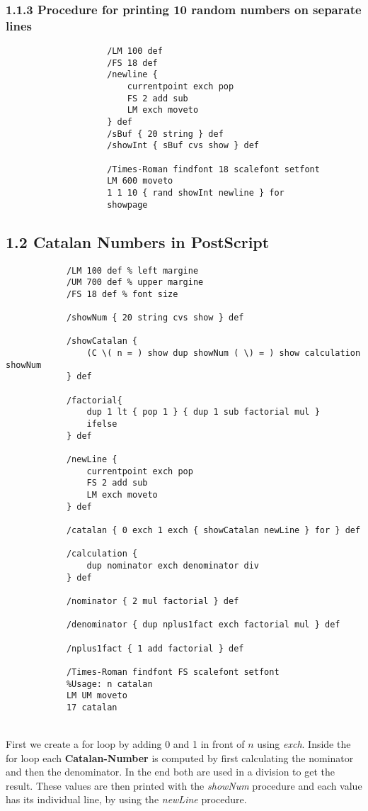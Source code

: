 \documentclass{article}
\begin{document}
\begin{adjustwidth}{2em}{2em}
		\subsubsection*{1.1.3 Procedure for printing 10 random numbers on separate lines}
		\begin{adjustwidth}{2em}{}
			\begin{tcolorbox}
				\begin{verbatim}
					/LM 100 def
					/FS 18 def
					/newline {
					    currentpoint exch pop
					    FS 2 add sub
					    LM exch moveto
					} def
					/sBuf { 20 string } def
					/showInt { sBuf cvs show } def
					
					/Times-Roman findfont 18 scalefont setfont
					LM 600 moveto
					1 1 10 { rand showInt newline } for
					showpage
				\end{verbatim}
			\end{tcolorbox}
		\end{adjustwidth}
	\end{adjustwidth}
	
	\subsection*{1.2 Catalan Numbers in PostScript}
	\begin{adjustwidth}{2em}{2em}
	\begin{tcolorbox}
		\begin{verbatim}
			/LM 100 def % left margine
			/UM 700 def % upper margine
			/FS 18 def % font size

			/showNum { 20 string cvs show } def

			/showCatalan {
			    (C \( n = ) show dup showNum ( \) = ) show calculation showNum
			} def

			/factorial{
			    dup 1 lt { pop 1 } { dup 1 sub factorial mul }
			    ifelse
			} def

			/newLine {
			    currentpoint exch pop
			    FS 2 add sub
			    LM exch moveto
			} def

			/catalan { 0 exch 1 exch { showCatalan newLine } for } def

			/calculation {
			    dup nominator exch denominator div
			} def

			/nominator { 2 mul factorial } def

			/denominator { dup nplus1fact exch factorial mul } def

			/nplus1fact { 1 add factorial } def

			/Times-Roman findfont FS scalefont setfont
			%Usage: n catalan
			LM UM moveto
			17 catalan
		\end{verbatim}
	\end{tcolorbox}
	\hfill \\
	\noindent First we create a for loop by adding 0 and 1 in front of $n$ using \textit{exch}. Inside the for loop each \textbf{Catalan-Number} is computed by first calculating the nominator and then the denominator. In the end both are used in a division to get the result. These values are then printed with the \textit{showNum} procedure and each value has its individual line, by using the \textit{newLine} procedure.
	\end{adjustwidth}
\end{document}
